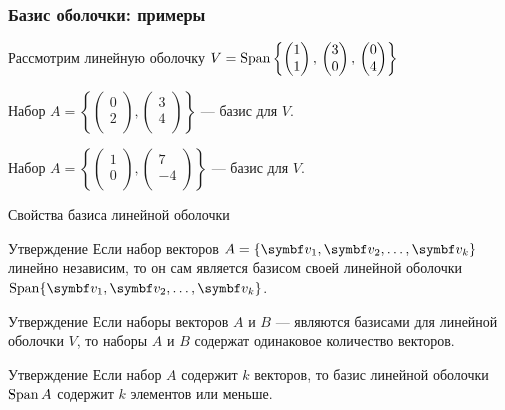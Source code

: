 \begin{frame}
\frametitle{Базис оболочки: примеры}

Рассмотрим линейную оболочку $V = \operatorname{Span}\left\{
\begin{pmatrix}
  1 \\
  1 \\
\end{pmatrix}, \, 
\begin{pmatrix}
  3 \\
  0 \\
\end{pmatrix},  \,
\begin{pmatrix}
  0 \\
  4 \\
\end{pmatrix}  
\right\}$

\pause

Набор $A = \left\{ \begin{pmatrix}
      0 \\
      2 \\
    \end{pmatrix}, \begin{pmatrix}
      3 \\
      4 \\
    \end{pmatrix} \right\}$ — базис для $V$.

\pause

Набор $A = \left\{ \begin{pmatrix}
  1 \\
  0 \\
\end{pmatrix}, \begin{pmatrix}
  7 \\
  -4 \\
\end{pmatrix} \right\}$ — базис для $V$.

\end{frame}




\begin{frame}{Свойства базиса линейной оболочки}

\begin{block}{Утверждение}
Если набор векторов $A =\{ \bv_1, \bv_2, \ldots, \bv_k\}$ линейно независим, то он сам
является базисом своей линейной оболочки $\Span  \{ \bv_1, \bv_2, \ldots, \bv_k\}$.
\end{block}


\pause
\begin{block}{Утверждение}
Если наборы векторов $A$ и $B$ — являются базисами для линейной оболочки $V$,
то наборы $A$ и $B$ содержат одинаковое количество векторов. 
\end{block}
  
\pause
\begin{block}{Утверждение}
Если набор $A$ содержит $k$ векторов, 
то базис линейной оболочки $\operatorname{Span} A$ содержит $k$ элементов или меньше. 
\end{block}
  


\end{frame}


